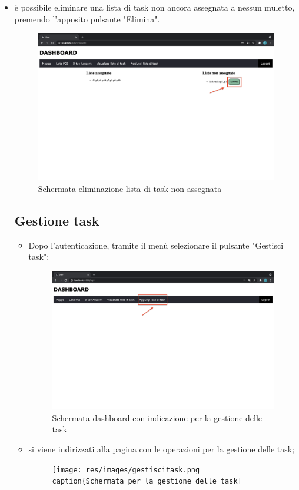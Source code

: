 \begin{itemize}
\begin{figure}[H]
    \end{figure}
    \item è possibile eliminare una lista di task non ancora assegnata a nessun muletto, premendo l'apposito pulsante "Elimina".
    \begin{figure}[H]
        \centering
        \includegraphics[scale=0.2]{res/images/deletelist.png}
        \caption{Schermata eliminazione lista di task non assegnata}
    \end{figure}
    

\subsection{Gestione task}
\begin{itemize}
    \item Dopo l'autenticazione, tramite il menù selezionare il pulsante "Gestisci task";
    \begin{figure}[H]
        \centering
        \includegraphics[scale=0.2]{res/images/dashboard9.png}
        \caption{Schermata dashboard con indicazione per la gestione delle task}
    \end{figure}
    \item si viene indirizzati alla pagina con le operazioni per la gestione delle task;
    \begin{figure}[H]
        \centering
        \texttt{[image: res/images/gestiscitask.png
        \\caption\{Schermata per la gestione delle task]}
    \end{figure}
\end{itemize}

\end{itemize}
